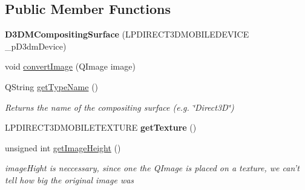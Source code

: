 \subsection*{Public Member Functions}
\begin{DoxyCompactItemize}
\item 
\hypertarget{class_picto_1_1_d3_d_m_compositing_surface_affa5b1108ac90ad62504d48763655e26}{{\bfseries D3\-D\-M\-Compositing\-Surface} (L\-P\-D\-I\-R\-E\-C\-T3\-D\-M\-O\-B\-I\-L\-E\-D\-E\-V\-I\-C\-E \-\_\-p\-D3dm\-Device)}\label{class_picto_1_1_d3_d_m_compositing_surface_affa5b1108ac90ad62504d48763655e26}

\item 
void \hyperlink{class_picto_1_1_d3_d_m_compositing_surface_a656a9113f32fd4afd5df41066e976e39}{convert\-Image} (Q\-Image image)
\item 
\hypertarget{class_picto_1_1_d3_d_m_compositing_surface_a669d8e743157e068138fc36ce473dca0}{Q\-String \hyperlink{class_picto_1_1_d3_d_m_compositing_surface_a669d8e743157e068138fc36ce473dca0}{get\-Type\-Name} ()}\label{class_picto_1_1_d3_d_m_compositing_surface_a669d8e743157e068138fc36ce473dca0}

\begin{DoxyCompactList}\small\item\em Returns the name of the compositing surface (e.\-g. \char`\"{}\-Direct3\-D\char`\"{}) \end{DoxyCompactList}\item 
\hypertarget{class_picto_1_1_d3_d_m_compositing_surface_a8bbe8e79e1b714a369af90c34eb5fd13}{L\-P\-D\-I\-R\-E\-C\-T3\-D\-M\-O\-B\-I\-L\-E\-T\-E\-X\-T\-U\-R\-E {\bfseries get\-Texture} ()}\label{class_picto_1_1_d3_d_m_compositing_surface_a8bbe8e79e1b714a369af90c34eb5fd13}

\item 
\hypertarget{class_picto_1_1_d3_d_m_compositing_surface_a496cce202f1547ba448d0402e844995d}{unsigned int \hyperlink{class_picto_1_1_d3_d_m_compositing_surface_a496cce202f1547ba448d0402e844995d}{get\-Image\-Height} ()}\label{class_picto_1_1_d3_d_m_compositing_surface_a496cce202f1547ba448d0402e844995d}

\begin{DoxyCompactList}\small\item\em image\-Hight is neccessary, since one the Q\-Image is placed on a texture, we can't tell how big the original image was \end{DoxyCompactList}\end{DoxyCompactItemize}


